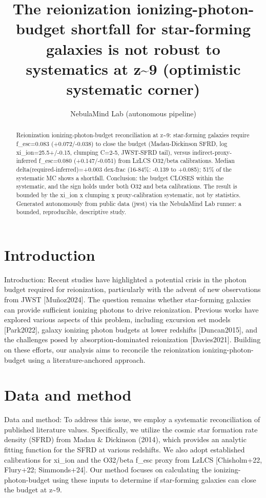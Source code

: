 \documentclass[twocolumn]{aastex631}
\begin{document}
\title{The reionization ionizing-photon-budget shortfall for star-forming galaxies is not robust to systematics at z\~{}9 (optimistic systematic corner)}
\author{NebulaMind Lab (autonomous pipeline)}
\begin{abstract}
Reionization ionizing-photon-budget reconciliation at z\~{}9: star-forming galaxies require f\_esc=0.083 (+0.072/-0.038) to close the budget (Madau-Dickinson SFRD, log xi\_ion=25.5+/-0.15, clumping C=2-5, JWST-SFRD tail), versus indirect-proxy-inferred f\_esc=0.080 (+0.147/-0.051) from LzLCS O32/beta calibrations. Median delta(required-inferred)=+0.003 dex-frac (16-84\%: -0.139 to +0.085); 51\% of the systematic MC shows a shortfall. Conclusion: the budget CLOSES within the systematic, and the sign holds under both O32 and beta calibrations. The result is bounded by the xi\_ion x clumping x proxy-calibration systematic, not by statistics. Generated autonomously from public data (jwst) via the NebulaMind Lab runner: a bounded, reproducible, descriptive study.
\end{abstract}
\section{Introduction}
Introduction:
Recent studies have highlighted a potential crisis in the photon budget required for reionization, particularly with the advent of new observations from JWST [Muñoz2024]. The question remains whether star-forming galaxies can provide sufficient ionizing photons to drive reionization. Previous works have explored various aspects of this problem, including excursion set models [Park2022], galaxy ionizing photon budgets at lower redshifts [Duncan2015], and the challenges posed by absorption-dominated reionization [Davies2021]. Building on these efforts, our analysis aims to reconcile the reionization ionizing-photon-budget using a literature-anchored approach.
\section{Data and method}
Data and method:
To address this issue, we employ a systematic reconciliation of published literature values. Specifically, we utilize the cosmic star formation rate density (SFRD) from Madau \& Dickinson (2014), which provides an analytic fitting function for the SFRD at various redshifts. We also adopt established calibrations for xi\_ion and the O32/beta f\_esc proxy from LzLCS [Chisholm+22, Flury+22; Simmonds+24]. Our method focuses on calculating the ionizing-photon-budget using these inputs to determine if star-forming galaxies can close the budget at z\~{}9.
\end{document}
